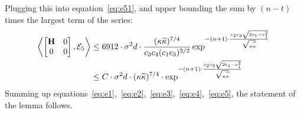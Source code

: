 Plugging this into equation~\ref{eq:e51}, and upper bounding the sum by $(n-t)$ times the largest term of the series:
\begin{align}
\label{eq:e5}
\left\langle \begin{bmatrix}\mathbf{H}&0\\0&0\end{bmatrix}, \mathcal{E}_5 \right\rangle&\leq6912\cdot\sigma^2d\cdot\frac{({\kappa}\widetilde{\kappa})^{7/4}}{c_3c_4(c_1c_3)^{3/2}}\exp^{-(n+1)\cdot\frac{c_2c_3\sqrt{2c_1-c_1^2}}{\sqrt{{\kappa}\widetilde{\kappa}}}}\nonumber\\
&\leq C\cdot\sigma^2d\cdot({\kappa}\widetilde{\kappa})^{7/4}\cdot\exp^{-(n+1)\cdot\frac{c_2c_3\sqrt{2c_1-c_1^2}}{\sqrt{{\kappa}\widetilde{\kappa}}}}
\end{align}
Summing up equations~\ref{eq:e1},~\ref{eq:e2},~\ref{eq:e3},~\ref{eq:e4},~\ref{eq:e5}, the statement of the lemma follows.